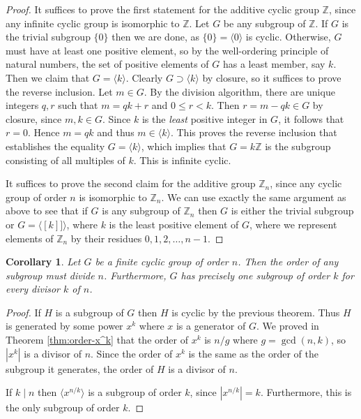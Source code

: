 \documentclass[11pt]{article}
\newtheorem{cor}[thm]{Corollary}
\theoremstyle{definition}
\newcommand{\Z}{\mathbb{Z}} %
\newcommand{\gen}[1]{\langle #1 \rangle}
\begin{document}
\begin{proof}
It suffices to prove the first statement for the additive cyclic group
$\Z$, since any infinite cyclic group is isomorphic to $\Z$. Let $G$
be any subgroup of $\Z$. If $G$ is the trivial subgroup $\{0\}$ then we
are done, as $\{0\} = \gen{0}$ is cyclic. Otherwise, $G$ must have at
least one positive element, so by the well-ordering principle of
natural numbers, the set of positive elements of $G$ has a least
member, say $k$. Then we claim that $G = \gen{k}$.  Clearly $G \supset
\gen{k}$ by closure, so it suffices to prove the reverse
inclusion. Let $m \in G$. By the division algorithm, there are unique
integers $q,r$ such that $m = qk+r$ and $0 \le r < k$.  Then $r = m -
qk \in G$ by closure, since $m,k \in G$. Since $k$ is the \emph{least}
positive integer in $G$, it follows that $r=0$. Hence $m=qk$ and thus
$m \in \gen{k}$.  This proves the reverse inclusion that establishes
the equality $G = \gen{k}$, which implies that $G = k\Z$ is the
subgroup consisting of all multiples of $k$. This is infinite cyclic.

It suffices to prove the second claim for the additive group $\Z_n$,
since any cyclic group of order $n$ is isomorphic to $\Z_n$. We can
use exactly the same argument as above to see that if $G$ is any
subgroup of $\Z_n$ then $G$ is either the trivial subgroup or $G =
\gen{[k]]}$, where $k$ is the least positive element of $G$, where we
  represent elements of $\Z_n$ by their residues $0,1, 2, \dots, n-1$.
\end{proof}


\begin{cor}
  Let $G$ be a finite cyclic group of order $n$. Then the order of any
  subgroup must divide $n$. Furthermore, $G$ has precisely one
  subgroup of order $k$ for every divisor $k$ of $n$.
\end{cor}

\begin{proof}
  If $H$ is a subgroup of $G$ then $H$ is cyclic by the previous
  theorem. Thus $H$ is generated by some power $x^k$ where $x$ is a
  generator of $G$. We proved in Theorem \ref{thm:order-x^k} that the
  order of $x^k$ is $n/g$ where $g = \gcd(n,k)$, so $|x^k|$ is a
  divisor of $n$. Since the order of $x^k$ is the same as the order of
  the subgroup it generates, the order of $H$ is a divisor of $n$. 

  If $k \mid n$ then $\gen{x^{n/k}}$ is a subgroup of order $k$, since
  $|x^{n/k}| = k$. Furthermore, this is the only subgroup of order $k$.
\end{proof}
\end{document}
